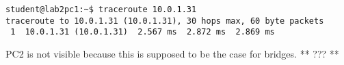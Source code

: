 \begin{lstlisting}
student@lab2pc1:~$ traceroute 10.0.1.31
traceroute to 10.0.1.31 (10.0.1.31), 30 hops max, 60 byte packets
 1  10.0.1.31 (10.0.1.31)  2.567 ms  2.872 ms  2.869 ms
\end{lstlisting}

PC2 is not visible because this is supposed to be the case for bridges. ** ??? **
